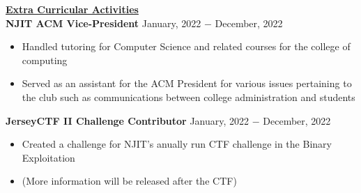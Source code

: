 \documentclass{article}
\begin{document}

\noindent \textbf{\underline{Extra Curricular Activities}} \\
\noindent \textbf{NJIT ACM Vice-President} \hfill January, 2022 $-$ December, 2022
\begin{itemize}[noitemsep,nolistsep,leftmargin=*]
\item {Handled tutoring for Computer Science and related courses for the college of computing}
\item {Served as an assistant for the ACM President for various issues pertaining to the club such as communications between college administration and students\\}
\end{itemize}

\noindent \textbf{JerseyCTF II Challenge Contributor} \hfill January, 2022 $-$ December, 2022
\begin{itemize}[noitemsep,nolistsep,leftmargin=*]
\item {Created a challenge for NJIT's anually run CTF challenge in the Binary Exploitation}
\item {(More information will be released after the CTF)}
\end{itemize}

\end{document}
